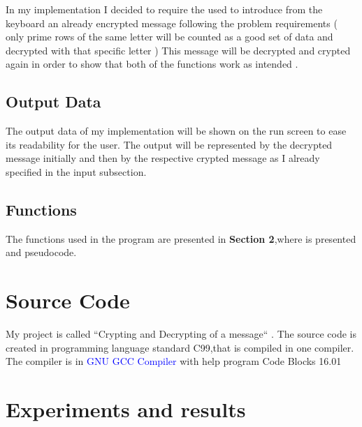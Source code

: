 \documentclass[12]{article}
\begin{document}
 
 In my implementation I decided to require the used to introduce from the keyboard an already encrypted message following the problem requirements ( only prime rows of the same letter will be counted as a good set of data and decrypted with that specific letter ) This message will be decrypted and crypted again in order to show that both of the functions work as intended . 










\subsection{Output Data}
\textcolor{white}{}  



The output data of my implementation will be shown on the run screen to ease its readability for the user. The output will be represented by the decrypted message initially and then by the respective crypted message as I already specified in the input subsection.












\subsection{Functions}
\textcolor{white}{}

The functions used in the program are presented in \textbf{Section 2},where is presented and pseudocode.





\section{Source Code}

\textcolor{white}{}


My project is called ``Crypting and Decrypting of a message`` . The source code is created in  programming language standard C99,that is compiled in one  compiler. The  compiler is in \textcolor{blue}{GNU GCC Compiler} with help program Code Blocks 16.01 

\newpage
\section{Experiments and results}
\textcolor{white}{}
\end{document}

